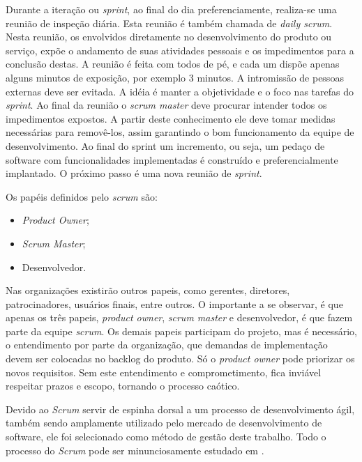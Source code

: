 Durante a iteração ou \emph{sprint}, ao final do dia preferenciamente, realiza-se uma reunião de inspeção diária. 
Esta reunião é também chamada de \emph{daily scrum}. 
Nesta reunião, os envolvidos diretamente no desenvolvimento do produto ou serviço, expõe o andamento de suas atividades pessoais e os impedimentos para a conclusão destas. 
A reunião é feita com todos de pé, e cada um dispõe apenas alguns minutos de exposição, por exemplo 3 minutos. 
A intromissão de pessoas externas deve ser evitada. 
A idéia é manter a objetividade e o foco nas tarefas do \emph{sprint}.
Ao final da reunião o \emph{scrum master} deve procurar intender todos os impedimentos expostos. A partir deste conhecimento ele deve tomar medidas necessárias para removê-los, assim garantindo o bom funcionamento da equipe de desenvolvimento.
Ao final do sprint um incremento, ou seja, um pedaço de software com funcionalidades implementadas é construído e preferencialmente implantado. O próximo passo é uma nova reunião de \emph{sprint}.

Os papéis definidos pelo \emph{scrum} são:
\begin{itemize}	
	\item \emph{Product Owner};
	\item \emph{Scrum Master};
	\item Desenvolvedor.
\end{itemize}

Nas organizações existirão outros papeis, como gerentes, diretores, patrocinadores, usuários finais, entre outros. 
O importante a se observar, é que apenas os três papeis, \emph{product owner}, \emph{scrum master} e desenvolvedor, é que fazem parte da equipe \emph{scrum}. 
Os demais papeis participam do projeto, mas é necessário, o entendimento por parte da organização, que demandas de implementação devem ser colocadas no backlog do produto. 
Só o \emph{product owner} pode priorizar os novos requisitos. 
Sem este entendimento e comprometimento, fica inviável respeitar prazos e escopo, tornando o processo caótico.

Devido ao \emph{Scrum} servir de espinha dorsal a um processo de desenvolvimento ágil, também sendo amplamente utilizado pelo mercado de desenvolvimento de software, ele foi selecionado como método de gestão deste trabalho. 
Todo o processo do \emph{Scrum} pode ser minunciosamente estudado em \cite{Schwaber2001}.


